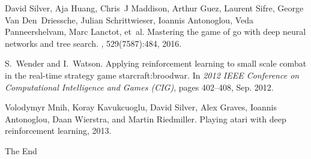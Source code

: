 \documentclass{beamer}
\begin{document}
\begin{frame}[allowframebreaks]
{\begin{thebibliography}{0}
David Silver, Aja Huang, Chris~J Maddison, Arthur Guez, Laurent Sifre, George
  Van Den~Driessche, Julian Schrittwieser, Ioannis Antonoglou, Veda
  Panneershelvam, Marc Lanctot, et~al.
\newblock Mastering the game of go with deep neural networks and tree search.
, 529(7587):484, 2016.

S.~{Wender} and I.~{Watson}.
\newblock Applying reinforcement learning to small scale combat in the
  real-time strategy game starcraft:broodwar.
\newblock In {\em 2012 IEEE Conference on Computational Intelligence and Games (CIG)}, pages 402--408, Sep. 2012.

Volodymyr Mnih, Koray Kavukcuoglu, David Silver, Alex Graves, Ioannis
  Antonoglou, Daan Wierstra, and Martin Riedmiller.
\newblock Playing atari with deep reinforcement learning, 2013.


\end{thebibliography}
}


\end{frame}



\begin{frame}
\Huge{\centerline{The End}}
\end{frame}

\end{document}

